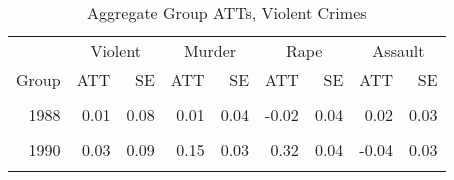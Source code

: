 \begin{table}[!h]

\caption{\label{tab:CSEst}Aggregate Group ATTs, Violent Crimes}
\centering
\begin{tabular}[t]{rrrrrrrrr}
\toprule
\multicolumn{1}{c}{ } & \multicolumn{2}{c}{Violent} & \multicolumn{2}{c}{Murder} & \multicolumn{2}{c}{Rape} & \multicolumn{2}{c}{Assault} \\
\cmidrule(l{3pt}r{3pt}){2-3} \cmidrule(l{3pt}r{3pt}){4-5} \cmidrule(l{3pt}r{3pt}){6-7} \cmidrule(l{3pt}r{3pt}){8-9}
Group & ATT & SE & ATT & SE & ATT & SE & ATT & SE\\
\midrule
\cellcolor{gray!6}{1987} & \cellcolor{gray!6}{-0.13} & \cellcolor{gray!6}{0.08} & \cellcolor{gray!6}{-0.33} & \cellcolor{gray!6}{0.04} & \cellcolor{gray!6}{-0.17} & \cellcolor{gray!6}{0.04} & \cellcolor{gray!6}{-0.05} & \cellcolor{gray!6}{0.03}\\
1988 & 0.01 & 0.08 & 0.01 & 0.04 & -0.02 & 0.04 & 0.02 & 0.03\\
\cellcolor{gray!6}{1989} & \cellcolor{gray!6}{-0.03} & \cellcolor{gray!6}{0.31} & \cellcolor{gray!6}{-0.21} & \cellcolor{gray!6}{0.11} & \cellcolor{gray!6}{-0.06} & \cellcolor{gray!6}{0.10} & \cellcolor{gray!6}{0.02} & \cellcolor{gray!6}{0.19}\\
1990 & 0.03 & 0.09 & 0.15 & 0.03 & 0.32 & 0.04 & -0.04 & 0.03\\
\cellcolor{gray!6}{1991} & \cellcolor{gray!6}{0.48} & \cellcolor{gray!6}{0.09} & \cellcolor{gray!6}{-0.36} & \cellcolor{gray!6}{0.04} & \cellcolor{gray!6}{0.20} & \cellcolor{gray!6}{0.03} & \cellcolor{gray!6}{0.55} & \cellcolor{gray!6}{0.03}\\
\bottomrule
\end{tabular}
\end{table}
